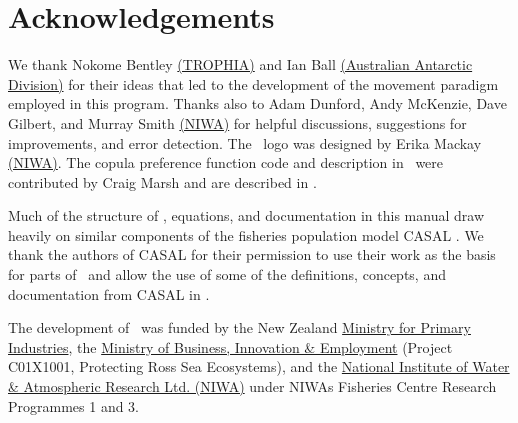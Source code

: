 \section{Acknowledgements\label{sec:acknowledgements}}

We thank Nokome Bentley \href{http://www.trophia.co.nz}{(TROPHIA)} and Ian Ball \href{http://www.aad.gov.au}{(Australian Antarctic Division)} for their ideas that led to the development of the movement paradigm employed in this program. Thanks also to Adam Dunford, Andy McKenzie, Dave Gilbert, and Murray Smith \href{http://www.niwa.co.nz}{(NIWA)} for helpful discussions, suggestions for improvements, and error detection. The \SPM\ logo was designed by Erika Mackay \href{http://www.niwa.co.nz}{(NIWA)}. The copula preference function code and description in \SPM\ were contributed by Craig Marsh and are described in \cite{Marsh2015}.

Much of the structure of \SPM, equations, and documentation in this manual draw heavily on similar components of the fisheries population model CASAL \citep{1388}. We thank the authors of CASAL for their permission to use their work as the basis for parts of \SPM\ and allow the use of some of the definitions, concepts, and documentation from CASAL in \SPM. 

The development of \SPM\ was funded by the New Zealand \href{http://www.mpi.govt.nz}{Ministry for Primary Industries}, the \href{http://www.msi.govt.nz}{Ministry of Business, Innovation \& Employment} (Project C01X1001, Protecting Ross Sea Ecosystems), and the \href{http://www.niwa.co.nz}{National Institute of Water \& Atmospheric Research Ltd. (NIWA)} under NIWAs Fisheries Centre Research Programmes 1 and 3. 
